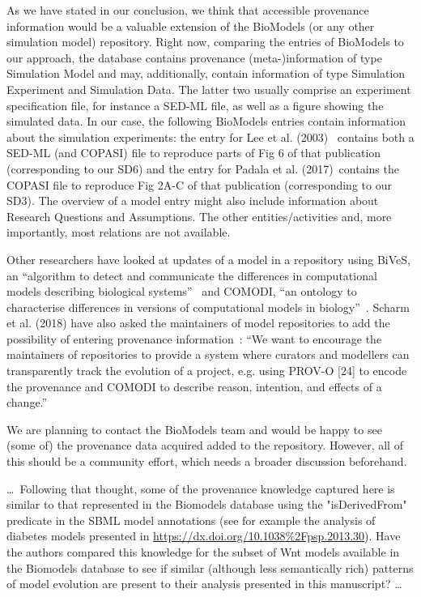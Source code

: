 \documentclass{article}
\begin{document}
As we have stated in our conclusion, we think that accessible provenance information would be a valuable extension of the BioModels (or any other simulation model) repository.
Right now, comparing the entries of BioModels to our approach, the database contains provenance (meta-)information of type Simulation Model and may, additionally, contain information of type Simulation Experiment and Simulation Data.
The latter two usually comprise an experiment specification file, for instance a SED-ML file, as well as a figure showing the simulated data.
In our case, the following BioModels entries contain information about the simulation experiments: the entry for Lee et al. (2003)~\cite{Lee2003} contains both a SED-ML (and COPASI) file to reproduce parts of Fig 6 of that publication (corresponding to our SD6) and the entry for Padala et al. (2017)~\cite{Padala2017}contains the COPASI file to reproduce Fig 2A-C of that publication (corresponding to our SD3).
The overview of a model entry might also include information about Research Questions and Assumptions.
The other entities/activities and, more importantly, most relations are not available.

Other researchers have looked at updates of a model in a repository using BiVeS, an \enquote{algorithm to detect and communicate the differences in computational models describing biological systems}~\cite{Scharm2016a} and COMODI, \enquote{an ontology to characterise differences in versions of computational models in biology}~\cite{Scharm2016}.
Scharm et al. (2018) have also asked the maintainers of model repositories to add the possibility of entering provenance information~\cite{Scharm2018}: \enquote{We want to encourage the maintainers of repositories to provide a system where curators and modellers can transparently track the evolution of a project, e.g. using PROV-O [24] to encode the provenance and COMODI to describe reason, intention, and effects of a change.}

We are planning to contact the BioModels team and would be happy to see (some of) the provenance data acquired added to the repository.
However, all of this should be a community effort, which needs a broader discussion beforehand.

\begin{mdframed}
\ldots\, Following that thought, some of the provenance knowledge captured here is similar to that represented in the Biomodels database using the "isDerivedFrom" predicate in the SBML model annotations (see for example the analysis of diabetes models presented in \url{https://dx.doi.org/10.1038\%2Fpsp.2013.30}).
Have the authors compared this knowledge for the subset of Wnt models available in the Biomodels database to see if similar (although less semantically rich) patterns of model evolution are present to their analysis presented in this manuscript? \ldots
\end{mdframed}
\end{document}
